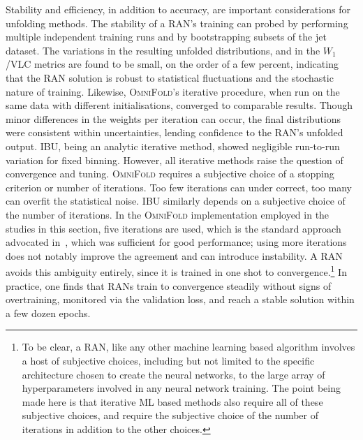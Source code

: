 {{            Stability and efficiency, in addition to accuracy, are important considerations for unfolding methods.
            The stability of a RAN's training can probed by performing multiple independent training runs and by bootstrapping subsets of the jet dataset.
            The variations in the resulting unfolded distributions, and in the $W_1$/VLC metrics are found to be small, on the order of a few percent, indicating that the RAN solution is robust to statistical fluctuations and the stochastic nature of training.
            Likewise, \textsc{OmniFold}’s iterative procedure, when run on the same data with different initialisations, converged to comparable results.
            Though minor differences in the weights per iteration can occur, the final distributions were consistent within uncertainties, lending confidence to the RAN's unfolded output.
            IBU, being an analytic iterative method, showed negligible run-to-run variation for fixed binning.
            However, all iterative methods raise the question of convergence and tuning.
            \textsc{OmniFold} requires a subjective choice of a stopping criterion or number of iterations.
            Too few iterations can under correct, too many can overfit the statistical noise.
            IBU similarly depends on a subjective choice of the number of iterations.
            In the \textsc{OmniFold} implementation employed in the studies in this section, five iterations are used, which is the standard approach advocated in~\cite{andreassen_omnifold_2020}, which was sufficient for good performance; using more iterations does not notably improve the agreement and can introduce instability.
            A RAN avoids this ambiguity entirely, since it is trained in one shot to convergence.\footnote{To be clear, a RAN, like any other machine learning based algorithm involves a host of subjective choices, including but not limited to the specific architecture chosen to create the neural networks, to the large array of hyperparameters involved in any neural network training. The point being made here is that iterative ML based methods also require all of these subjective choices, and require the subjective choice of the number of iterations in addition to the other choices.}
            In practice, one finds that RANs train to convergence steadily without signs of overtraining, monitored via the validation loss, and reach a stable solution within a few dozen epochs.
}}
